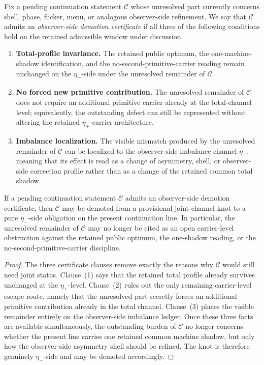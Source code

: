 \begin{definition}
Fix a pending continuation statement \(\mathcal C\) whose unresolved part currently concerns shell, phase, flicker, menu, or analogous observer-side refinement. We say that \(\mathcal C\) admits an \emph{observer-side demotion certificate} if all three of the following conditions hold on the retained admissible window under discussion.
\begin{enumerate}[leftmargin=2em]
  \item \textbf{Total-profile invariance.} The retained public optimum, the one-machine-shadow identification, and the no-second-primitive-carrier reading remain unchanged on the \(\eta_+\)-side under the unresolved remainder of \(\mathcal C\).
  \item \textbf{No forced new primitive contribution.} The unresolved remainder of \(\mathcal C\) does not require an additional primitive carrier already at the total-channel level; equivalently, the outstanding defect can still be represented without altering the retained \(\eta_+\)-carrier architecture.
  \item \textbf{Imbalance localization.} The visible mismatch produced by the unresolved remainder of \(\mathcal C\) can be localized to the observer-side imbalance channel \(\eta_-\), meaning that its effect is read as a change of asymmetry, shell, or observer-side correction profile rather than as a change of the retained common total shadow.
\end{enumerate}
\end{definition}

\begin{proposition}
If a pending continuation statement \(\mathcal C\) admits an observer-side demotion certificate, then \(\mathcal C\) may be demoted from a provisional joint-channel knot to a pure \(\eta_-\)-side obligation on the present continuation line. In particular, the unresolved remainder of \(\mathcal C\) may no longer be cited as an open carrier-level obstruction against the retained public optimum, the one-shadow reading, or the no-second-primitive-carrier discipline.
\end{proposition}

\begin{proof}
The three certificate clauses remove exactly the reasons why \(\mathcal C\) would still need joint status. Clause~(1) says that the retained total profile already survives unchanged at the \(\eta_+\)-level. Clause~(2) rules out the only remaining carrier-level escape route, namely that the unresolved part secretly forces an additional primitive contribution already in the total channel. Clause~(3) places the visible remainder entirely on the observer-side imbalance ledger. Once these three facts are available simultaneously, the outstanding burden of \(\mathcal C\) no longer concerns whether the present line carries one retained common machine shadow, but only how the observer-side asymmetry shell should be refined. The knot is therefore genuinely \(\eta_-\)-side and may be demoted accordingly.
\end{proof}

